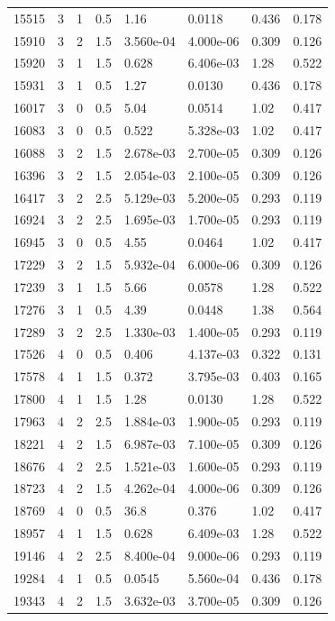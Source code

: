 \documentclass[preview]{standalone}
\begin{document}
{{{{\begin{tabular}{L{1.2cm}C{1.2cm} C{0.3cm}C{0.5cm} C{1.4cm}C{1.4cm} C{1.4cm}C{1.4cm}}
  15515  &     3  & 1     & 0.5 &  1.16  & 0.0118  & 0.436 &  0.178   \\ 
  15910  &     3  & 2     & 1.5 &  3.560e-04  & 4.000e-06  & 0.309 &  0.126   \\ 
  15920  &     3  & 1     & 1.5 &  0.628  & 6.406e-03  & 1.28 &  0.522   \\ 
  15931  &     3  & 1     & 0.5 &  1.27  & 0.0130  & 0.436 &  0.178   \\ 
  16017  &     3  & 0     & 0.5 &  5.04  & 0.0514  & 1.02 &  0.417   \\ 
  16083  &     3  & 0     & 0.5 &  0.522  & 5.328e-03  & 1.02 &  0.417   \\ 
  16088  &     3  & 2     & 1.5 &  2.678e-03  & 2.700e-05  & 0.309 &  0.126   \\ 
  16396  &     3  & 2     & 1.5 &  2.054e-03  & 2.100e-05  & 0.309 &  0.126   \\ 
  16417  &     3  & 2     & 2.5 &  5.129e-03  & 5.200e-05  & 0.293 &  0.119   \\ 
  16924  &     3  & 2     & 2.5 &  1.695e-03  & 1.700e-05  & 0.293 &  0.119   \\ 
  16945  &     3  & 0     & 0.5 &  4.55  & 0.0464  & 1.02 &  0.417   \\ 
  17229  &     3  & 2     & 1.5 &  5.932e-04  & 6.000e-06  & 0.309 &  0.126   \\ 
  17239  &     3  & 1     & 1.5 &  5.66  & 0.0578  & 1.28 &  0.522   \\ 
  17276  &     3  & 1     & 0.5 &  4.39  & 0.0448  & 1.38 &  0.564   \\ 
  17289  &     3  & 2     & 2.5 &  1.330e-03  & 1.400e-05  & 0.293 &  0.119   \\ 
  17526  &     4  & 0     & 0.5 &  0.406  & 4.137e-03  & 0.322 &  0.131   \\ 
  17578  &     4  & 1     & 1.5 &  0.372  & 3.795e-03  & 0.403 &  0.165   \\ 
  17800  &     4  & 1     & 1.5 &  1.28  & 0.0130  & 1.28 &  0.522   \\ 
  17963  &     4  & 2     & 2.5 &  1.884e-03  & 1.900e-05  & 0.293 &  0.119   \\ 
  18221  &     4  & 2     & 1.5 &  6.987e-03  & 7.100e-05  & 0.309 &  0.126   \\ 
  18676  &     4  & 2     & 2.5 &  1.521e-03  & 1.600e-05  & 0.293 &  0.119   \\ 
  18723  &     4  & 2     & 1.5 &  4.262e-04  & 4.000e-06  & 0.309 &  0.126   \\ 
  18769  &     4  & 0     & 0.5 &  36.8  & 0.376  & 1.02 &  0.417   \\ 
  18957  &     4  & 1     & 1.5 &  0.628  & 6.409e-03  & 1.28 &  0.522   \\ 
  19146  &     4  & 2     & 2.5 &  8.400e-04  & 9.000e-06  & 0.293 &  0.119   \\ 
  19284  &     4  & 1     & 0.5 &  0.0545  & 5.560e-04  & 0.436 &  0.178   \\ 
  19343  &     4  & 2     & 1.5 &  3.632e-03  & 3.700e-05  & 0.309 &  0.126   \\ 
\hline 
\end{tabular} 

}}}}
\end{document}
